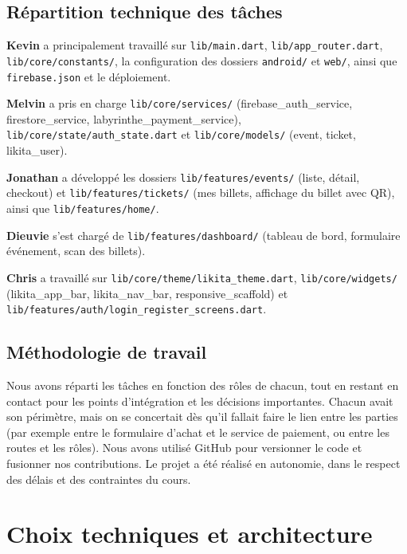 \documentclass[11pt,a4paper,oneside]{article}
\begin{document}
\subsection{Répartition technique des tâches}

\textbf{Kevin} a principalement travaillé sur \texttt{lib/main.dart}, \texttt{lib/app\_router.dart}, \texttt{lib/core/constants/}, la configuration des dossiers \texttt{android/} et \texttt{web/}, ainsi que \texttt{firebase.json} et le déploiement.

\textbf{Melvin} a pris en charge \texttt{lib/core/services/} (firebase\_auth\_service, firestore\_service, labyrinthe\_payment\_service), \texttt{lib/core/state/auth\_state.dart} et \texttt{lib/core/models/} (event, ticket, likita\_user).

\textbf{Jonathan} a développé les dossiers \texttt{lib/features/events/} (liste, détail, checkout) et \texttt{lib/features/tickets/} (mes billets, affichage du billet avec QR), ainsi que \texttt{lib/features/home/}.

\textbf{Dieuvie} s'est chargé de \texttt{lib/features/dashboard/} (tableau de bord, formulaire événement, scan des billets).

\textbf{Chris} a travaillé sur \texttt{lib/core/theme/likita\_theme.dart}, \texttt{lib/core/widgets/} (likita\_app\_bar, likita\_nav\_bar, responsive\_scaffold) et \texttt{lib/features/auth/login\_register\_screens.dart}.

\subsection{Méthodologie de travail}

Nous avons réparti les tâches en fonction des rôles de chacun, tout en restant en contact pour les points d'intégration et les décisions importantes. Chacun avait son périmètre, mais on se concertait dès qu'il fallait faire le lien entre les parties (par exemple entre le formulaire d'achat et le service de paiement, ou entre les routes et les rôles). Nous avons utilisé GitHub pour versionner le code et fusionner nos contributions. Le projet a été réalisé en autonomie, dans le respect des délais et des contraintes du cours.

\section{Choix techniques et architecture}
\label{sec:technique}
\end{document}
